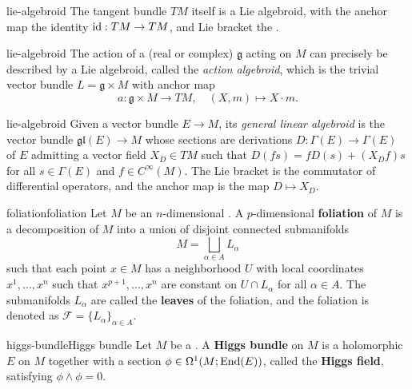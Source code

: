\begin{example}{lie-algebroid}
    The tangent bundle $TM$ itself is a Lie algebroid, with the anchor map the identity $\textup{id} : TM \to TM$, and Lie bracket the .
\end{example}

\begin{example}{lie-algebroid}
    The action of a (real or complex)  $\mathfrak{g}$ acting on $M$ can precisely be described by a Lie algebroid, called the \textit{action algebroid}, which is the trivial vector bundle $L = \mathfrak{g} \times M$ with anchor map
    \[ a : \mathfrak{g} \times M \to TM, \quad (X, m) \mapsto X \cdot m . \]
\end{example}

\begin{example}{lie-algebroid}
    Given a vector bundle $E \to M$, its \textit{general linear algebroid} is the vector bundle $\mathfrak{gl}(E) \to M$ whose sections are derivations $D : \Gamma(E) \to \Gamma(E)$ of $E$ admitting a vector field $X_D \in TM$ such that $D(f s) = f D(s) + (X_D f) s$ for all $s \in \Gamma(E)$ and $f \in C^\infty(M)$. The Lie bracket is the commutator of differential operators, and the anchor map is the map $D \mapsto X_D$.
\end{example}

\begin{topic}{foliation}{foliation}
    Let $M$ be an $n$-dimensional . A $p$-dimensional \textbf{foliation} of $M$ is a decomposition of $M$ into a union of disjoint connected submanifolds
    \[ M = \bigsqcup_{\alpha \in A} L_\alpha \]
    such that each point $x \in M$ has a neighborhood $U$ with local coordinates $x^1, \ldots, x^n$ such that $x^{p + 1}, \ldots, x^n$ are constant on $U \cap L_\alpha$ for all $\alpha \in A$. The submanifolds $L_\alpha$ are called the \textbf{leaves} of the foliation, and the foliation is denoted as $\mathcal{F} = \{ L_\alpha \}_{\alpha \in A}$.
\end{topic}

\begin{topic}{higgs-bundle}{Higgs bundle}
    Let $M$ be a . A \textbf{Higgs bundle} on $M$ is a holomorphic  $E$ on $M$ together with a section $\phi \in \Omega^1(M; \textup{End}(E))$, called the \textbf{Higgs field}, satisfying $\phi \wedge \phi = 0$.
\end{topic}

